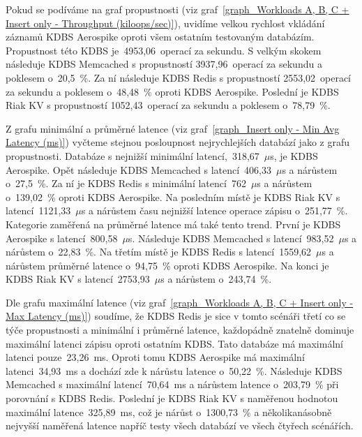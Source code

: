 \documentclass[czech,master,dept460,male,csharp,cpdeclaration]{diploma}
\begin{document}
	Pokud se podíváme na graf propustnosti (viz graf~\ref{graph_Workloads A, B, C + Insert only - Throughput (kiloops/sec)}), uvidíme velkou rychlost vkládání záznamů KDBS Aerospike oproti všem ostatním testovaným databázím. Propustnost této KDBS je~4953,06~operací za sekundu. S velkým skokem následuje KDBS Memcached s propustností 3937,96~operací za sekundu a poklesem o~20,5~\%. Za ní následuje KDBS Redis s propustností 2553,02~operací za sekundu a poklesem o~48,48~\% oproti KDBS Aerospike. Poslední je KDBS Riak KV s propustností 1052,43~operací za sekundu a poklesem o~78,79~\%.
	
	Z grafu minimální a průměrné latence (viz graf~\ref{graph_Insert only - Min Avg Latency (ms)}) vyčteme stejnou posloupnost nejrychlejších databází jako z grafu propustnosti. Databáze s nejnižší minimální latencí,~318,67~$\mu$s, je KDBS Aerospike. Opět následuje KDBS Memcached s latencí~406,33~$\mu$s a nárůstem o~27,5~\%. Za ní je KDBS Redis s minimální latencí~762~$\mu$s a nárůstem o~139,02~\% oproti KDBS Aerospike. Na posledním místě je KDBS Riak KV s latencí~1121,33~$\mu$s a nárůstem času nejnižší latence operace zápisu o~251,77~\%. Kategorie zaměřená na průměrné latence má také tento trend. První je KDBS Aerospike s latencí~800,58~$\mu$s. Následuje KDBS Memcached s latencí~983,52~$\mu$s a nárůstem o~22,83~\%. Na třetím místě je KDBS Redis s latencí~1559,62~$\mu$s a nárůstem průměrné latence o~94,75~\% oproti KDBS Aerospike. Na konci je KDBS Riak KV s latencí~2753,93~$\mu$s a nárůstem o~243,74~\%.
	
	Dle grafu maximální latence (viz graf~\ref{graph_Workloads A, B, C + Insert only - Max Latency (ms)}) soudíme, že KDBS Redis je sice v tomto scénáři třetí co se týče propustnosti a minimální i průměrné latence, každopádně znatelně dominuje maximální latenci zápisu oproti ostatním KDBS. Tato databáze má maximální latenci pouze~23,26~ms. Oproti tomu KDBS Aerospike má maximální latenci~34,93~ms a dochází zde k nárůstu latence o~50,22~\%. Následuje KDBS Memcached s maximální latencí~70,64~ms a nárůstem latence o~203,79~\% při porovnání s KDBS Redis. Poslední je KDBS Riak KV s naměřenou hodnotou maximální latence~325,89~ms, což je nárůst o~1300,73~\% a několikanásobně nejvyšší naměřená latence napříč testy všech databází ve všech čtyřech scénářích.
	
\end{document}
